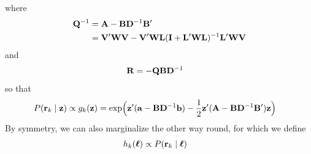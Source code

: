 \documentclass[a4paper,oneside,12pt,english]{report}
\def\Vmat{\mathbf{V}}
\def\zvec{\mathbf{z}}
\def\Lmat{\mathbf{L}}
\def\Bmat{\mathbf{B}}
\def\Wmat{\mathbf{W}}
\def\Dmat{\mathbf{D}}
\def\Imat{\mathbf{I}}
\def\Rmat{\mathbf{R}}
\def\rvec{\mathbf{r}}
\def\avec{\mathbf{a}}
\def\bvec{\mathbf{b}}
\begin{document}
where
\begin{align}
\begin{split}
\Qmat^{-1} &= \Amat-\Bmat\Dmat^{-1}\Bmat' \\
&= \Vmat'\Wmat\Vmat - \Vmat'\Wmat\Lmat(\Imat+\Lmat'\Wmat\Lmat)^{-1}\Lmat'\Wmat\Vmat 
\end{split}
\end{align}
and
\begin{align}
\Rmat &= -\Qmat\Bmat\Dmat^{-1}
\end{align}
so that
\begin{align}
P(\rvec_k\mid\zvec)  &\propto g_k(\zvec) = \exp\Bigl(
\zvec'(\avec-\Bmat\Dmat^{-1}\bvec) -\frac12\zvec'(\Amat-\Bmat\Dmat^{-1}\Bmat')\zvec
\Bigr)
\end{align}
By symmetry, we can also marginalize the other way round, for which we define
\begin{align}
h_k(\ellvec) &\propto P(\rvec_k\mid\ellvec)
\end{align}
\end{document}
